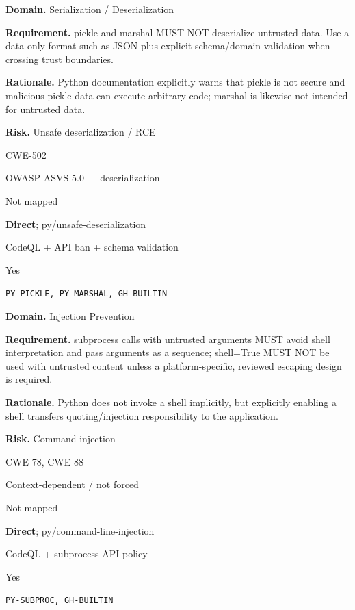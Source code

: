\documentclass[10pt,letterpaper]{article}
\newcommand{\prioritybadge}[2]{\tcbox[on line,boxrule=0pt,arc=1.2mm,boxsep=0.7mm,left=1mm,right=1mm,top=0.4mm,bottom=0.4mm,colback=#2!12,coltext=#2]{\scriptsize\bfseries #1}}
\begin{document}
\begin{rulebox}[title={\texttt{SCS-PY-DESER-001} \hfill \prioritybadge{Critical Control}{Critical}}]
\textbf{Domain.} Serialization / Deserialization

\textbf{Requirement.} pickle and marshal MUST NOT deserialize untrusted data. Use a data-only format such as JSON plus explicit schema/domain validation when crossing trust boundaries.

\textbf{Rationale.} Python documentation explicitly warns that pickle is not secure and malicious pickle data can execute arbitrary code; marshal is likewise not intended for untrusted data.

\textbf{Risk.} Unsafe deserialization / RCE

\begin{description}[leftmargin=2.65cm,labelwidth=2.3cm,style=nextline,itemsep=1pt,topsep=3pt]
  \item[CWE] CWE-502
  \item[OWASP] OWASP ASVS 5.0 --- deserialization
  \item[CERT] Not mapped
  \item[CodeQL] \textbf{Direct}; py/unsafe-deserialization
  \item[Enforcement] CodeQL + API ban + schema validation
  \item[Automation] Yes
  \item[Sources] \texttt{PY-PICKLE, PY-MARSHAL, GH-BUILTIN}
\end{description}
\end{rulebox}

\begin{rulebox}[title={\texttt{SCS-PY-INJ-001} \hfill \prioritybadge{Critical Control}{Critical}}]
\textbf{Domain.} Injection Prevention

\textbf{Requirement.} subprocess calls with untrusted arguments MUST avoid shell interpretation and pass arguments as a sequence; shell=True MUST NOT be used with untrusted content unless a platform-specific, reviewed escaping design is required.

\textbf{Rationale.} Python does not invoke a shell implicitly, but explicitly enabling a shell transfers quoting/injection responsibility to the application.

\textbf{Risk.} Command injection

\begin{description}[leftmargin=2.65cm,labelwidth=2.3cm,style=nextline,itemsep=1pt,topsep=3pt]
  \item[CWE] CWE-78, CWE-88
  \item[OWASP] Context-dependent / not forced
  \item[CERT] Not mapped
  \item[CodeQL] \textbf{Direct}; py/command-line-injection
  \item[Enforcement] CodeQL + subprocess API policy
  \item[Automation] Yes
  \item[Sources] \texttt{PY-SUBPROC, GH-BUILTIN}
\end{description}
\end{rulebox}
\end{document}
